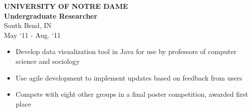 \documentclass[a4paper,10pt]{article}
\newenvironment{details}
{\begin{itemize}[label=\scalebox{.5}{\ding{117}},leftmargin=0.15in]}
{\end{itemize}}
\begin{document}
\begin{minipage}[t]{0.5\textwidth}
\textbf{UNIVERSITY OF NOTRE DAME\\Undergraduate Researcher}\\
South Bend, IN\\
May ‘11 - Aug. ‘11

\begin{details}
  \item Develop data visualization tool in Java for use by professors of
computer science and sociology
  \item Use agile development to implement updates based on feedback from users
  \item Compete with eight other groups in a final poster competition, awarded first place
\end{details}

\end{minipage}
\hspace{0.35 in}
\end{document}
